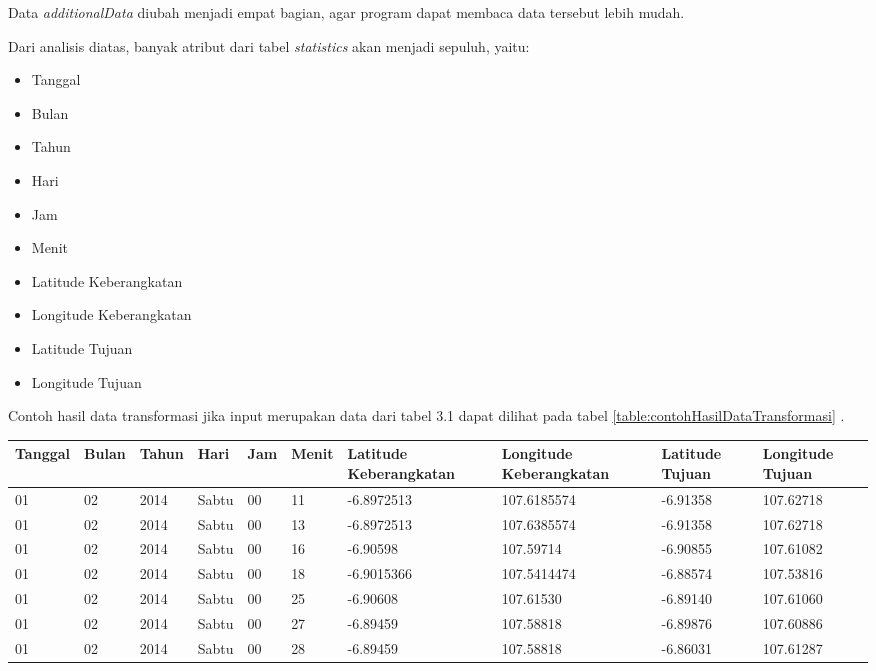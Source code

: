 Data \textsl{additionalData} diubah menjadi empat bagian, agar program dapat membaca data tersebut lebih mudah.

Dari analisis diatas, banyak atribut dari tabel \textsl{statistics} akan menjadi sepuluh, yaitu:
\begin{itemize}
	\item Tanggal
	\item Bulan
	\item Tahun
	\item Hari
	\item Jam
	\item Menit
	\item Latitude Keberangkatan
	\item Longitude Keberangkatan
	\item Latitude Tujuan
	\item Longitude Tujuan
\end{itemize}

Contoh hasil data transformasi jika input merupakan data dari tabel 3.1 dapat dilihat pada tabel \ref{table:contohHasilDataTransformasi}	.

\begin{table}[h]
\caption{Contoh hasil data transformasi}
\label{table:contohHasilDataTransformasi}
\begin{longtable}{|l|l|l|l|l|l|l|l|l|l|}
\hline
\textbf{Tanggal}	& \textbf{Bulan}	& \textbf{Tahun} 	& \textbf{Hari} & \textbf{Jam}	& \textbf{Menit} & \textbf{Latitude Keberangkatan} & \textbf{Longitude Keberangkatan} & \textbf{Latitude Tujuan} & \textbf{Longitude Tujuan}      \\ \hline
01				         	& 02								& 2014						& Sabtu         & 00         	& 11						 & -6.8972513										 & 107.6185574 							  & -6.91358                & 107.62718 \\ \hline
01				         	& 02								& 2014						& Sabtu         & 00         	& 13						 & -6.8972513										 & 107.6385574                & -6.91358							  & 107.62718 \\ \hline
01				          & 02								& 2014						& Sabtu         & 00         	& 16						 & -6.90598											 & 107.59714     		  				& -6.90855						&107.61082 \\ \hline
01				          & 02								& 2014						& Sabtu         & 00         	& 18						 & -6.9015366										 & 107.5414474 								& -6.88574					    & 107.53816 \\ \hline
01				          & 02								& 2014						& Sabtu         & 00         	& 25						 & -6.90608										   & 107.61530     						  & -6.89140					 &107.61060 \\ \hline
01				          & 02								& 2014						& Sabtu         & 00         	& 27						 & -6.89459											 & 107.58818     							& -6.89876						&107.60886 \\ \hline
01				          & 02								& 2014						& Sabtu         & 00         	& 28						 & -6.89459											 &107.58818  								   & -6.86031					 &107.61287 \\ \hline
\end{longtable}
\end{table} 

